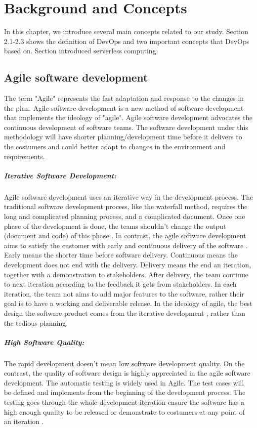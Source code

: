 \chapter{Background and Concepts}
In this chapter, we introduce several main concepts related to our study. Section 2.1-2.3 shows the definition of DevOps and two important concepts that DevOps based on. Section introduced serverless computing.
\section{Agile software development}
\label{agile}
The term "Agile" represents the fast adaptation and response to the changes in the plan\cite{highsmith2002agile}.
Agile software development is a new method of software development that implements the ideology of "agile". Agile software development advocates the continuous development of software teams. The software development under this methodology will have shorter planning/development time before it delivers to the costumers and could better adapt to changes in the environment and requirements.
\paragraph{Iterative Software Development:} Agile software development uses an iterative way in the development process. The traditional software development process, like the waterfall method, requires the long and complicated planning process, and a complicated document. Once one phase of the development is done, the teams shouldn't change the output (document and code) of this phase \cite{cusumano1995beyond}. In contrast, the agile software development aims to satisfy the customer with early and continuous delivery of the software \cite{beck2001manifesto}. Early means the shorter time before software delivery. Continuous means the development does not end with the delivery. Delivery means the end an iteration, together with a demonstration to stakeholders. After delivery, the team continue to next iteration according to the feedback it gets from stakeholders. In each iteration, the team not aims to add major features to the software, rather their goal \cite{beck1999embracing} is to have a working and deliverable release. In the ideology of agile, the best design the software product comes from the iterative development \cite{beck2001manifesto}, rather than the tedious planning.
\paragraph{High Software Quality:} The rapid development doesn't mean low software development quality. On the contrast, the quality of software design is highly appreciated in the agile software development. The automatic testing is widely used in Agile. The test cases will be defined and implements from the beginning of the development process. The testing goes through the whole development iteration ensure the software has a high enough quality to be released or demonstrate to costumers at any point of an iteration \cite{Agilesof32:online}.
